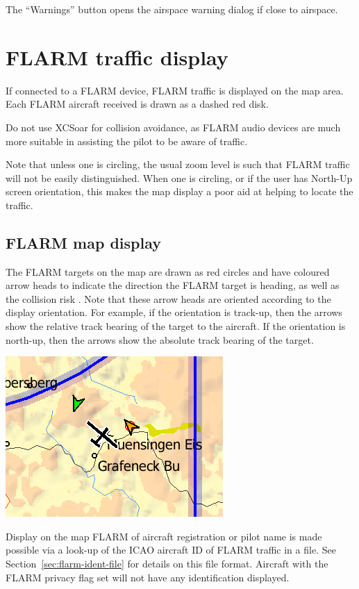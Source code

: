 \documentclass[a4paper,12pt]{refrep}
\begin{document}
The ``Warnings'' button opens the airspace warning dialog if close to
airspace.

\section{FLARM traffic display}

If connected to a FLARM device, FLARM traffic is displayed on the map
area.  Each FLARM aircraft received is drawn as a dashed red disk.

\warning Do not use XCSoar for collision avoidance, as
FLARM audio devices are much more suitable in assisting the pilot to be
aware of traffic.

Note that unless one is circling, the usual zoom level is such that
FLARM traffic will not be easily distinguished.  When one is circling,
or if the user has North-Up screen orientation, this makes the map display 
a poor aid at helping to locate the traffic.

\subsection*{FLARM map display}

The FLARM targets on the map are drawn as red circles and have coloured 
arrow heads to indicate the direction the FLARM target is
heading, as well as the collision risk .  Note that these
arrow heads are oriented according to the display orientation.  For example, if 
the orientation is track-up, then the arrows show the relative track bearing of
the target to the aircraft.  If the orientation is north-up, then the arrows show the
absolute track bearing of the target.

\begin{center}
\includegraphics[angle=0,width=0.4\linewidth,keepaspectratio='true']{figures/flarmmap.png}
\end{center}

Display on the map FLARM of aircraft registration or pilot name is
made possible via a look-up of the ICAO aircraft ID of FLARM traffic
in a file.  See Section~\ref{sec:flarm-ident-file} for details on this
file format.  Aircraft with the FLARM privacy flag set will not have
any identification displayed.
\end{document}
